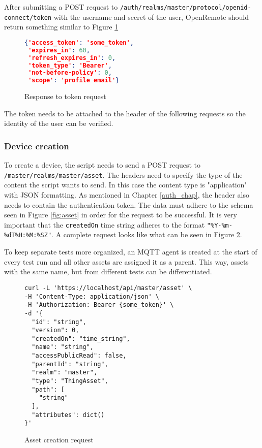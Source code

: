 After submitting a POST request to \lstinline|/auth/realms/master/protocol/openid-connect/token| with the username and secret of the user, OpenRemote should return something similar to Figure \ref{fig:token-request} 
\begin{figure}[h]
    \centering
    \begin{lstlisting}[language=json,firstnumber=1]
{'access_token': 'some_token', 
 'expires_in': 60, 
 'refresh_expires_in': 0, 
 'token_type': 'Bearer', 
 'not-before-policy': 0, 
 'scope': 'profile email'}
\end{lstlisting}
    \caption{Response to token request}
    \label{fig:token-request}
\end{figure}

The token needs to be attached to the header of the following requests so the identity of the user can be verified.

\subsubsection{Device creation}
To create a device, the script needs to send a POST request to \lstinline|/master/realms/master/asset|. The headers need to specify the type of the content the script wants to send. In this case the content type is "application" with JSON formatting. As mentioned in Chapter \ref{auth_chap}, the header also needs to contain the authentication token. The data must adhere to the schema seen in Figure \ref{fig:asset} in order for the request to be successful. It is very important that the \lstinline|createdOn| time string adheres to the format \lstinline{"%Y-%m-%dT%H:%M:%SZ"}. A complete request looks like what can be seen in Figure \ref{fig:asset-create-request}. 

To keep separate tests more organized, an MQTT agent is created at the start of every test run and all other assets are assigned it as a parent. This way, assets with the same name, but from different tests can be differentiated.

\begin{figure}[ht]
    \centering
    \begin{lstlisting}[language=curl,firstnumber=1]
curl -L 'https://localhost/api/master/asset' \
-H 'Content-Type: application/json' \
-H 'Authorization: Bearer {some_token}' \
-d '{
  "id": "string",
  "version": 0,
  "createdOn": "time_string",
  "name": "string",
  "accessPublicRead": false,
  "parentId": "string",
  "realm": "master",
  "type": "ThingAsset",
  "path": [
    "string"
  ],
  "attributes": dict()
}'
\end{lstlisting}
    \caption{Asset creation request}
    \label{fig:asset-create-request}
\end{figure}


